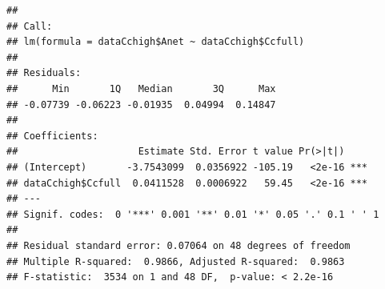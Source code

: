 \documentclass[
]{krantz}
\makeatletter
\newenvironment{Shaded}{\begin{snugshade}}{\end{snugshade}}
\newcommand{\DecValTok}[1]{\textcolor[rgb]{0.00,0.00,0.81}{#1}}
\newcommand{\FunctionTok}[1]{\textcolor[rgb]{0.00,0.00,0.00}{#1}}
\newcommand{\NormalTok}[1]{#1}
\newcommand{\OtherTok}[1]{\textcolor[rgb]{0.56,0.35,0.01}{#1}}
\newcommand{\SpecialCharTok}[1]{\textcolor[rgb]{0.00,0.00,0.00}{#1}}
\newenvironment{kframe}{%
\medskip{}
\setlength{\fboxsep}{.8em}
 \def\at@end@of@kframe{}%
 \ifinner\ifhmode%
  \def\at@end@of@kframe{\end{minipage}}%
  \begin{minipage}{\columnwidth}%
 \fi\fi%
 \def\FrameCommand##1{\hskip\@totalleftmargin \hskip-\fboxsep
 \colorbox{shadecolor}{##1}\hskip-\fboxsep
     \hskip-\linewidth \hskip-\@totalleftmargin \hskip\columnwidth}%
 \MakeFramed {\advance\hsize-\width
   \@totalleftmargin\z@ \linewidth\hsize
   \@setminipage}}%
 {\par\unskip\endMakeFramed%
 \at@end@of@kframe}
\renewenvironment{Shaded}{\begin{kframe}}{\end{kframe}}
\makeatother
\begin{document}
\begin{Shaded}
\end{Shaded}

\begin{verbatim}
## 
## Call:
## lm(formula = dataCchigh$Anet ~ dataCchigh$Ccfull)
## 
## Residuals:
##      Min       1Q   Median       3Q      Max 
## -0.07739 -0.06223 -0.01935  0.04994  0.14847 
## 
## Coefficients:
##                     Estimate Std. Error t value Pr(>|t|)    
## (Intercept)       -3.7543099  0.0356922 -105.19   <2e-16 ***
## dataCchigh$Ccfull  0.0411528  0.0006922   59.45   <2e-16 ***
## ---
## Signif. codes:  0 '***' 0.001 '**' 0.01 '*' 0.05 '.' 0.1 ' ' 1
## 
## Residual standard error: 0.07064 on 48 degrees of freedom
## Multiple R-squared:  0.9866, Adjusted R-squared:  0.9863 
## F-statistic:  3534 on 1 and 48 DF,  p-value: < 2.2e-16
\end{verbatim}
\end{document}
